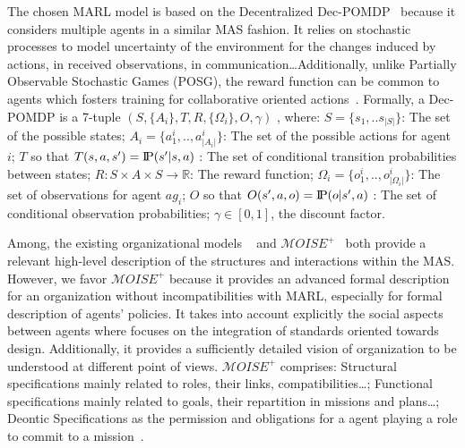 \documentclass[runningheads]{llncs}
\newcommand{\probP}{\text{I\kern-0.15em P}}
\begin{document}
The chosen MARL model is based on the Decentralized Dec-POMDP~\cite{Oliehoek2016} because it considers multiple agents in a similar MAS fashion. It relies on stochastic processes to model uncertainty of the environment for the changes induced by actions, in received observations, in communication\dots Additionally, unlike Partially Observable Stochastic Games (POSG), the reward function can be common to agents which fosters training for collaborative oriented actions~\cite{Beynier2013}. Formally, a Dec-POMDP is a 7-tuple $(S,\{A_i\},T,R,\{\Omega_i\},O,\gamma)$ , where: $S = \{s_1, ..s_{|S|}\}$: The set of the possible states; $A_{i} = \{a_{1}^{i},..,a_{|A_{i}|}^{i}\}$: The set of the possible actions for agent $i$; $T$ so that $T(s,a,s') = \probP{(s'|s,a)}$ : The set of conditional transition probabilities between states; $R: S \times A \times S \rightarrow \mathbb{R}$: The reward function; $\Omega_{i} = \{o_{1}^{i},..,o_{|\Omega_{i}|}^{i}\}$: The set of observations for agent $ag_i$; $O$ so that $O(s',a,o) = \probP{(o|s',a)}$ : The set of conditional observation probabilities; $\gamma \in [0,1]$, the discount factor.

Among, the existing organizational models ~\cite{Ferber2004} and \allowbreak $\mathcal{M}OISE^+$~\cite{Hubner2002} both provide a relevant high-level description of the structures and interactions within the MAS. However, we favor $\mathcal{M}OISE^+$ because it provides an advanced formal description for an organization without incompatibilities with MARL, especially for formal description of agents' policies. It takes into account explicitly the social aspects between agents where  focuses on the integration of standards oriented towards design. Additionally, it provides a sufficiently detailed vision of organization to be understood at different point of views. $\mathcal{M}OISE^+$ comprises: Structural specifications mainly related to roles, their links, compatibilities\dots; Functional specifications mainly related to goals, their repartition in missions and plans\dots; Deontic Specifications as the permission and obligations for a agent playing a role to commit to a mission~\cite{Hubner2002}.

\end{document}
